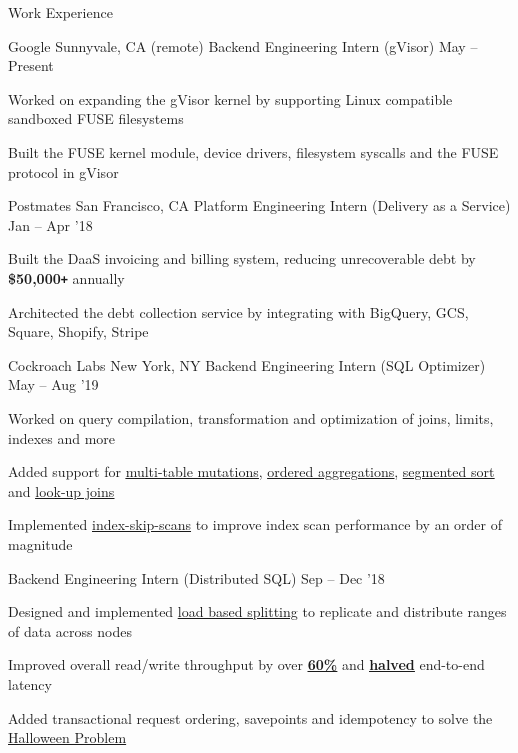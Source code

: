 \documentclass{resume} %
\begin{document}
\begin{rSection}{Work Experience}
  \begin{rWorkSection}{Google}
		     {Sunnyvale, CA (remote)}
		     {Backend Engineering Intern (gVisor)}
		     {May -- Present}
    {
      \item Worked on expanding the gVisor kernel by supporting Linux
        compatible sandboxed FUSE filesystems 
      \item Built
        the FUSE kernel module, device drivers, filesystem syscalls and the FUSE protocol in gVisor
    }
  \end{rWorkSection}
  \begin{rWorkSection}{Postmates}
		     {San Francisco, CA}
		     {Platform Engineering Intern (Delivery as a Service)}
		     {Jan -- Apr '18}
    {
      \item Built the DaaS invoicing and
        billing system, reducing unrecoverable debt by \textbf{\$50,000\texttt{+}} annually
      \item Architected the debt collection service by integrating with
        BigQuery, GCS, Square, Shopify, Stripe
    }
  \end{rWorkSection}
  \begin{rDualWorkSection}{Cockroach Labs}
         {New York, NY}
         {Backend Engineering Intern (SQL Optimizer)}
         {May -- Aug '19}
    {
       \item Worked on query compilation, transformation and
         optimization of joins, limits, indexes and more
       \item Added support for  
         \href{https://github.com/cockroachdb/cockroach/pull/38452}{\ul{multi-table
           mutations}}, 
         \href{https://github.com/cockroachdb/cockroach/pull/38452}{\underline{ordered
           aggregations}}, 
         \href{https://github.com/cockroachdb/cockroach/pull/38452}{\underline{segmented
             sort}} and 
         \href{https://github.com/cockroachdb/cockroach/pull/38285}{\underline{look-up
           joins}}
       \item Implemented
         \href{https://github.com/cockroachdb/cockroach/pull/39668}{\ul{index-skip-scans}}
         to improve index scan performance by an order of magnitude
    }
    {Backend Engineering Intern (Distributed SQL)}
    {Sep -- Dec '18}
    {
       \item Designed and implemented \href{https://github.com/cockroachdb/cockroach/pull/31413}
      {\underline{load based splitting}} to replicate
      and distribute ranges of data across nodes
    \item Improved overall read/write throughput by over
         \setul{4pt}{.4pt}
         \href{https://github.com/cockroachdb/cockroach/issues/31819}{\textbf{\ul{60\%}}}
         and
         \href{https://github.com/cockroachdb/cockroach/issues/31819}{\textbf{\ul{halved}}}
         end-to-end latency
       \item Added transactional request
           ordering, savepoints and idempotency to solve the 
         \setul{4pt}{.4pt}
         \href{https://github.com/cockroachdb/cockroach/pull/33244}{\ul{Halloween
             Problem}}
    }
  \end{rDualWorkSection}


\end{rSection}
\end{document}
